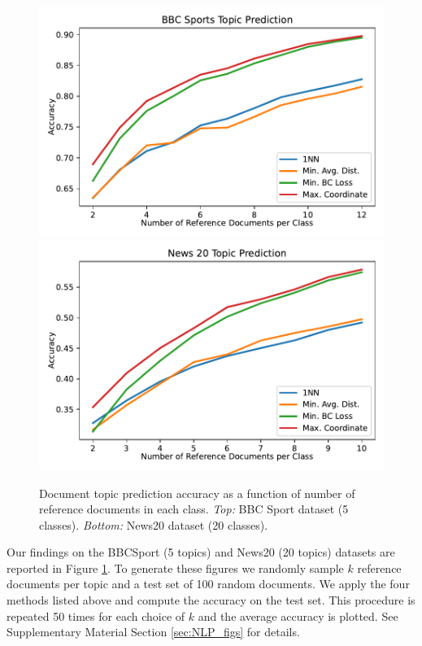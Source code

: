 \documentclass[nohyperref]{article}
\theoremstyle{definition}
\begin{document}
\begin{figure}[t!]
    \centering
    \includegraphics[width=\linewidth]{figures/bbcsport.pdf}
    \includegraphics[width=\linewidth]{figures/news20.pdf}
    \caption{Document topic prediction accuracy as a function of number of reference documents in each class.  \emph{Top:}  BBC Sport dataset (5 classes). \emph{Bottom:} News20 dataset (20 classes).}
    \label{fig:NLP}
\end{figure}



Our findings on the BBCSport (5 topics) and News20 (20 topics) datasets are reported in Figure \ref{fig:NLP}.  To generate these figures we randomly sample $k$ reference documents per topic and a test set of 100 random documents. We apply the four methods listed above and compute the accuracy on the test set. This procedure is repeated 50 times for each choice of $k$ and the average accuracy is plotted. See Supplementary Material Section \ref{sec:NLP_figs} for details.
\end{document}
